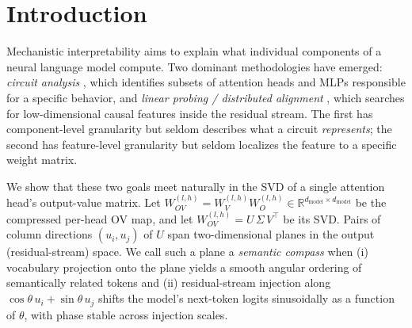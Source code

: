 \section{Introduction}
\label{sec:intro}

Mechanistic interpretability aims to explain what individual components of a
neural language model compute. Two dominant methodologies have emerged:
\emph{circuit analysis} \citep{elhage2021mathematical,wang2023interpretability,conmy2023acdc}, which
identifies subsets of attention heads and MLPs responsible for a specific
behavior, and \emph{linear probing / distributed alignment}
\citep{park2024linearrep,geiger2024das,marks2024geometry}, which searches for
low-dimensional causal features inside the residual stream. The first has
component-level granularity but seldom describes what a circuit
\emph{represents}; the second has feature-level granularity but seldom
localizes the feature to a specific weight matrix.

We show that these two goals meet naturally in the SVD of a single attention
head's output-value matrix. Let $W_{OV}^{(l,h)} = W_V^{(l,h)} W_O^{(l,h)}
\in \mathbb{R}^{d_\text{model} \times d_\text{model}}$ be the compressed
per-head OV map, and let $W_{OV}^{(l,h)} = U\,\Sigma\,V^\top$ be its SVD.
Pairs of column directions $(u_i, u_j)$ of $U$ span two-dimensional planes
in the output (residual-stream) space. We call such a plane a \emph{semantic
compass} when (i) vocabulary projection onto the plane yields a smooth
angular ordering of semantically related tokens and (ii) residual-stream
injection along $\cos\theta\,u_i + \sin\theta\,u_j$ shifts the model's next-token
logits sinusoidally as a function of $\theta$, with phase stable across
injection scales.

